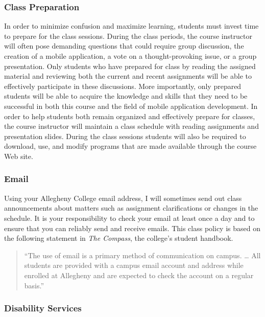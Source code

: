 \subsubsection*{Class Preparation}

In order to minimize confusion and maximize learning, students must invest time to prepare for the class sessions.
During the class periods, the course instructor will often pose demanding questions that could require group discussion,
the creation of a mobile application, a vote on a thought-provoking issue, or a group presentation.  Only students who
have prepared for class by reading the assigned material and reviewing both the current and recent assignments will be
able to effectively participate in these discussions.  More importantly, only prepared students will be able to acquire
the knowledge and skills that they need to be successful in both this course and the field of mobile application
development.  In order to help students both remain organized and effectively prepare for classes, the course instructor
will maintain a class schedule with reading assignments and presentation slides.   During the class sessions students
will also be required to download, use, and modify programs that are made available through the course Web site.

\subsubsection*{Email}

Using your Allegheny College email address, I will sometimes send out class announcements about matters such as
assignment clarifications or changes in the schedule. It is your responsibility to check your email at least once a day
and to ensure that you can reliably send and receive emails. This class policy is based on the following statement in
{\em The Compass}, the college's student handbook.

\vspace*{-.1in}
\begin{quote}
``The use of email is a primary method of communication on campus. \ldots
All students are provided with a campus email account and address while
enrolled at Allegheny and are expected to check the account on a regular
basis.'' 
\end{quote}
\vspace*{-.15in}

\subsubsection*{Disability Services}

